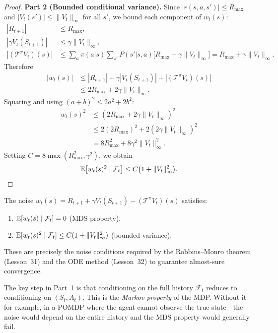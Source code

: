 \documentclass[11pt,a4paper]{article}
\begin{document}
\begin{proof}
\textbf{Part 2 (Bounded conditional variance).}
Since $|r(s,a,s')| \leq R_{\max}$ and
$|V_t(s')| \leq \|V_t\|_\infty$ for all $s'$, we bound
each component of $w_t(s)$:
\begin{align}
  |R_{t+1}| &\leq R_{\max}, \nonumber\\
  |\gamma V_t(S_{t+1})| &\leq \gamma \|V_t\|_\infty, \nonumber\\
  |(\mathcal{T}^\pi V_t)(s)|
    &\leq \sum_a \pi(a|s) \sum_{s'} P(s'|s,a)
      \bigl[R_{\max} + \gamma \|V_t\|_\infty\bigr]
    = R_{\max} + \gamma \|V_t\|_\infty.
  \label{eq:component_bounds}
\end{align}
Therefore
\begin{align}
  |w_t(s)|
  &\leq |R_{t+1}| + \gamma|V_t(S_{t+1})|
    + |(\mathcal{T}^\pi V_t)(s)| \nonumber\\
  &\leq 2R_{\max} + 2\gamma \|V_t\|_\infty.
  \label{eq:noise_bound}
\end{align}
Squaring and using $(a+b)^2 \leq 2a^2 + 2b^2$:
\begin{align}
  w_t(s)^2
  &\leq (2R_{\max} + 2\gamma\|V_t\|_\infty)^2 \nonumber\\
  &\leq 2(2R_{\max})^2 + 2(2\gamma\|V_t\|_\infty)^2
  \nonumber\\
  &= 8R_{\max}^2 + 8\gamma^2 \|V_t\|_\infty^2.
  \label{eq:noise_sq_bound}
\end{align}
Setting $C = 8\max(R_{\max}^2, \gamma^2)$, we obtain
\[
  \mathbb{E}\bigl[w_t(s)^2 \mid \mathcal{F}_t\bigr]
  \leq C\bigl(1 + \|V_t\|_\infty^2\bigr). \qedhere
\]
\end{proof}

\begin{keyresult}[title={TD Noise is a Martingale Difference Sequence}]
The noise $w_t(s) = R_{t+1} + \gamma V_t(S_{t+1})
- (\mathcal{T}^\pi V_t)(s)$ satisfies:
\begin{enumerate}[nosep]
  \item $\mathbb{E}[w_t(s) \mid \mathcal{F}_t] = 0$
    \quad (MDS property),
  \item $\mathbb{E}[w_t(s)^2 \mid \mathcal{F}_t]
    \leq C(1 + \|V_t\|_\infty^2)$
    \quad (bounded variance).
\end{enumerate}
These are precisely the noise conditions required by the
Robbins--Monro theorem (Lesson~31) and the ODE method
(Lesson~32) to guarantee almost-sure convergence.
\end{keyresult}

\begin{remark}
\label{rem:markov}
The key step in Part~1 is that conditioning on the full
history $\mathcal{F}_t$ reduces to conditioning on
$(S_t, A_t)$.  This is the \emph{Markov property} of the
MDP.  Without it---for example, in a POMDP where the agent
cannot observe the true state---the noise would depend on the
entire history and the MDS property would generally fail.
\end{remark}
\end{document}
